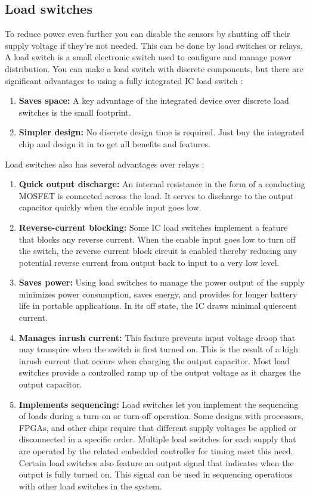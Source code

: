 \documentclass[11pt,a4paper]{article}
\begin{document}
\subsection{Load switches}
To reduce power even further you can disable the sensors by shutting off their supply voltage if they're not needed. This can be done by load switches or relays. A load switch is a small electronic switch used to configure and manage power distribution. You can make a load switch with discrete components, but there are significant advantages to using a fully integrated IC load switch \cite{loadSwitch}:
\begin{enumerate}
	\item \textbf{Saves space:} A key advantage of the integrated device over discrete load switches is the small footprint. 
	\item \textbf{Simpler design:} No discrete design time is required. Just buy the integrated chip and design it in to get all benefits and features.
\end{enumerate}
Load switches also has several advantages over relays \cite{loadSwitch}:
\begin{enumerate}
	\item \textbf{Quick output discharge:} An internal resistance in the form of a conducting MOSFET is connected across the load. It serves to discharge to the output capacitor quickly when the enable input goes low.
	\item \textbf{Reverse-current blocking:} Some IC load switches implement a feature that blocks any reverse current. When the enable input goes low to turn off the switch, the reverse current block circuit is enabled thereby reducing any potential reverse current from output back to input to a very low level.
	\item \textbf{Saves power:} Using load switches to manage the power output of the supply minimizes power consumption, saves energy, and provides for longer battery life in portable applications. In its off state, the IC draws minimal quiescent current.
	\item \textbf{Manages inrush current:} This feature prevents input voltage droop that may transpire when the switch is first turned on. This is the result of a high inrush current that occurs when charging the output capacitor. Most load switches provide a controlled ramp up of the output voltage as it charges the output capacitor.
	\item \textbf{Implements sequencing:} Load switches let you implement the sequencing of loads during a turn-on or turn-off operation. Some designs with processors, FPGAs, and other chips require that different supply voltages be applied or disconnected in a specific order. Multiple load switches for each supply that are operated by the related embedded controller for timing meet this need. Certain load switches also feature an output signal that indicates when the output is fully turned on. This signal can be used in sequencing operations with other load switches in the system.
\end{enumerate}
\end{document}

